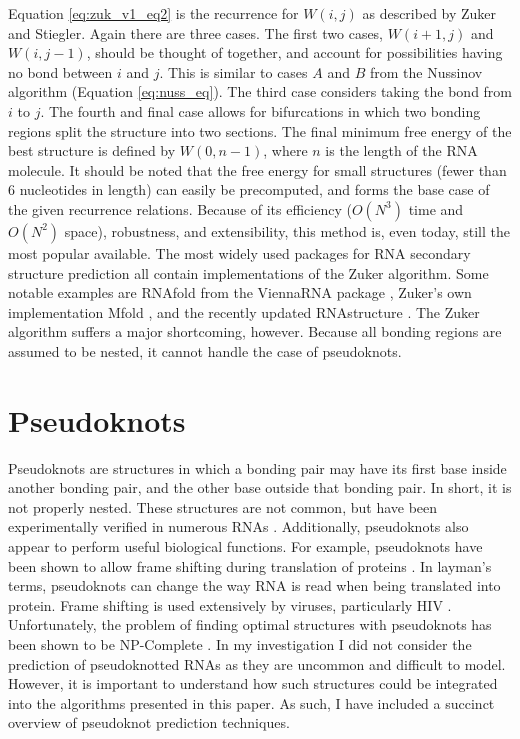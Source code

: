 \documentclass{cshonours}
\begin{document}
Equation \ref{eq:zuk_v1_eq2} is the recurrence for $W(i, j)$ as described by Zuker and Stiegler.
Again there are three cases. The first two cases, $W (i + 1, j)$ and $W(i, j - 1)$,
should be thought of together, and account for possibilities having no bond between $i$ and $j$. This is similar to cases $A$ and $B$ from the Nussinov algorithm (Equation \ref{eq:nuss_eq}). The third case considers taking the bond from
$i$ to $j$. The fourth and final case allows for bifurcations in which two bonding regions split
the structure into two sections. The final minimum free energy of the best structure is defined by $W(0, n-1)$, where $n$ is the length of the RNA molecule. It should
be noted that the free energy for small structures (fewer than 6 nucleotides in length) can easily be
precomputed, and forms the base case of the given recurrence relations. Because of
its efficiency ($O(N^3)$ time and $O(N^2)$ space), robustness, and extensibility, this method is,
even today, still the most popular available. The most widely used packages for RNA secondary structure prediction all contain implementations of the Zuker algorithm. Some notable examples are RNAfold from the ViennaRNA package \cite{lorenz2011viennarna}, Zuker's own implementation Mfold \cite{zuker2003mfold}, and the recently updated RNAstructure \cite{bellaousov2013rnastructure}. The Zuker algorithm suffers a major shortcoming, however. Because all bonding regions are assumed to be nested, it
cannot handle the case of pseudoknots. 


\section{Pseudoknots}

Pseudoknots are structures in which a bonding pair may have its first
base inside another bonding pair, and the other base outside that bonding pair.
In short, it is not properly nested. These structures are not common,
but have been experimentally verified in numerous RNAs \cite{taufer2009pseudobase}. Additionally, pseudoknots also appear to perform useful biological functions. For
example, pseudoknots have been shown to allow frame shifting during translation
of proteins \cite{namy2006mechanical}. In layman's terms, pseudoknots can change the way RNA is read
when being translated into protein. Frame shifting is used extensively by
viruses, particularly HIV \cite{namy2006mechanical}. Unfortunately, the problem of finding optimal
structures with pseudoknots has been shown to be NP-Complete \cite{lyngso2000rna}. In my investigation I did not consider the prediction of pseudoknotted RNAs as they are uncommon and difficult to model. However, it is important to understand how such structures could be integrated into the algorithms presented in this paper. As such, I have included a succinct overview of pseudoknot prediction techniques.
\end{document}
